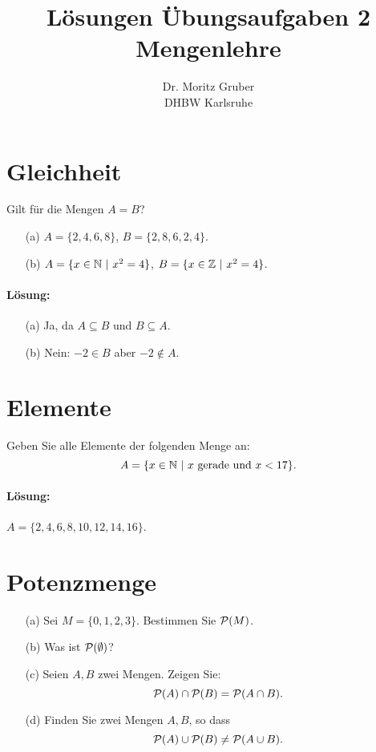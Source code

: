 \documentclass[
				a4paper,
				10pt
			]
			{scrartcl}
\author{Dr. Moritz Gruber\\ DHBW Karlsruhe}
\title{L\"osungen \"Ubungsaufgaben 2\\ 
	Mengenlehre
}
\date{}
\begin{document}
\maketitle


\section{Gleichheit}
Gilt f\"ur die Mengen $A=B$?
\begin{itemize}
	\item[(a)] $A = \{2,4,6,8\}$, $B = \{2,8,6,2,4\}$.
	\item[(b)] $A = \{ x \in \mathbb{N} ~|~ x^2 = 4\}$, $B = \{ x\in \mathbb{Z} ~|~ x^2 = 4\}$.
\end{itemize}

\paragraph{L\"osung:}
\begin{itemize}
	\item[(a)] Ja, da $A\subseteq B$ und $B\subseteq A$.
	\item[(b)] Nein: $-2 \in B$ aber $-2 \notin A$.
\end{itemize}


\section{Elemente}
Geben Sie alle Elemente der folgenden Menge an:
$$
	A = \{ x \in \mathbb{N} ~|~ x \text{~gerade und~} x < 17\}.
$$

\paragraph{L\"osung:}
$A = \{2,4,6,8,10,12,14,16 \}$.


\newpage
\section{Potenzmenge}

\begin{itemize}
	\item[(a)]Sei $M = \{0,1,2,3\}.$ Bestimmen Sie ${\cal P}(M)$.
	\item[(b)] Was ist ${\cal P}(\emptyset)$?
	\item[(c)] Seien $A, B$ zwei Mengen. Zeigen Sie:
			$$
				{\cal P}(A) \cap {\cal P}(B) = {\cal P}(A\cap B).
			$$
	\item[(d)] Finden Sie zwei Mengen $A,B$, so dass
			$$
				{\cal P}(A) \cup {\cal P}(B) \neq {\cal P}(A\cup B).
			$$
\end{itemize}
\end{document}

